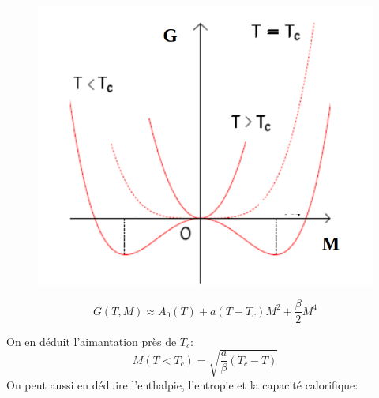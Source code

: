 \documentclass[10pt]{beamer}
\begin{document}
\begin{frame}{\insertsubsection}
    \begin{minipage}{.48\linewidth}
    \begin{figure}
        \centering
        \includegraphics[width=.7\textwidth]{Ferro_para.png}
    \end{figure}
    \begin{equation}
        G(T,M)\approx A_0(T) + a(T-T_c)M^2+\dfrac{\beta}{2}M^4
    \end{equation}
\end{minipage}
\begin{minipage}{.48\linewidth}
    On en déduit l'aimantation près de $T_c$:
    \begin{equation}
        M(T<T_c) = \sqrt{\dfrac{a}{\beta}(T_c-T)} 
    \end{equation}
    On peut aussi en déduire l'enthalpie, l'entropie et la capacité calorifique:

    
\end{minipage}
\end{frame}
\end{document}

